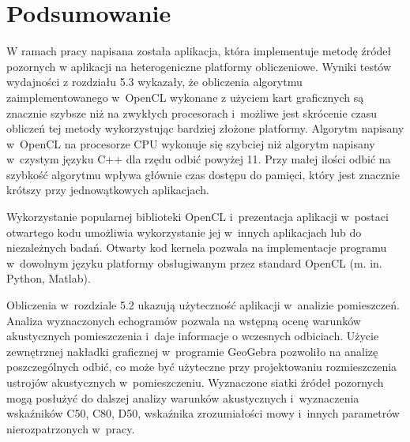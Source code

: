 \chapter{Podsumowanie}\label{cha:podsum}

W ramach pracy napisana została aplikacja, która implementuje metodę źródeł pozornych w aplikacji na heterogeniczne platformy obliczeniowe. Wyniki testów wydajności z rozdziału 5.3 wykazały, że obliczenia algorytmu zaimplementowanego w~OpenCL wykonane z użyciem kart graficznych są znacznie szybsze niż na zwykłych procesorach i~możliwe jest skrócenie czasu obliczeń tej metody wykorzystując bardziej złożone platformy. Algorytm napisany w~OpenCL na procesorze CPU wykonuje się szybciej niż algorytm napisany w~czystym języku C++ dla rzędu odbić powyżej 11. Przy małej ilości odbić na szybkość algorytmu wpływa głównie czas dostępu do pamięci, który jest znacznie krótszy przy jednowątkowych aplikacjach.    

Wykorzystanie popularnej biblioteki OpenCL i~prezentacja aplikacji w~postaci otwartego kodu umożliwia wykorzystanie jej w~innych aplikacjach  lub do niezależnych badań. Otwarty kod kernela pozwala na implementacje programu w~dowolnym języku platformy obsługiwanym przez standard OpenCL (m. in. Python, Matlab).

Obliczenia w~rozdziale 5.2 ukazują użyteczność aplikacji w~analizie pomieszczeń. Analiza wyznaczonych echogramów pozwala na wstępną ocenę warunków akustycznych pomieszczenia i~daje informacje o wczesnych odbiciach. Użycie zewnętrznej nakładki graficznej w~programie GeoGebra pozwoliło na analizę poszczególnych odbić, co może być użyteczne przy projektowaniu rozmieszczenia ustrojów akustycznych w~pomieszczeniu. Wyznaczone siatki źródeł pozornych mogą posłużyć do dalszej analizy warunków akustycznych i~wyznaczenia wskaźników C50, C80, D50, wskaźnika zrozumiałości mowy i~innych parametrów nierozpatrzonych w~pracy.